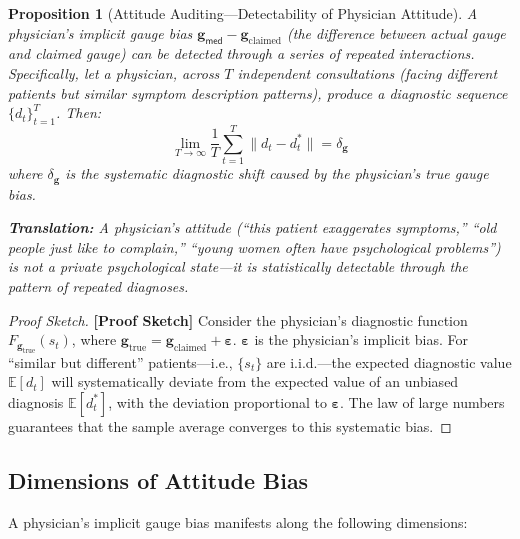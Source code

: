 \documentclass[12pt,a4paper]{article}
\newtheorem{proposition}[theorem]{Proposition}
\theoremstyle{remark}
\newcommand{\med}{\textsf{med}}
\newcommand{\rigorSketch}{\textnormal{\textbf{[Proof Sketch]}}}
\begin{document}
\begin{proposition}[Attitude Auditing---Detectability of Physician Attitude]\label{prop:attitude}
A physician's implicit gauge bias $\mathbf{g}_{\med} - \mathbf{g}_{\text{claimed}}$ (the difference between actual gauge and claimed gauge) can be detected through a series of repeated interactions. Specifically, let a physician, across $T$ independent consultations (facing different patients but similar symptom description patterns), produce a diagnostic sequence $\{d_t\}_{t=1}^{T}$. Then:
\begin{equation}
    \lim_{T \to \infty} \frac{1}{T} \sum_{t=1}^{T} \|d_t - d_t^*\| = \delta_{\mathbf{g}}
\end{equation}
where $\delta_{\mathbf{g}}$ is the systematic diagnostic shift caused by the physician's true gauge bias.

\textbf{Translation:} A physician's attitude (``this patient exaggerates symptoms,'' ``old people just like to complain,'' ``young women often have psychological problems'') is not a private psychological state---it is statistically detectable through the pattern of repeated diagnoses.
\end{proposition}

\begin{proof}[Proof Sketch]\rigorSketch
Consider the physician's diagnostic function $F_{\mathbf{g}_{\text{true}}}(s_t)$, where $\mathbf{g}_{\text{true}} = \mathbf{g}_{\text{claimed}} + \bm{\varepsilon}$. $\bm{\varepsilon}$ is the physician's implicit bias. For ``similar but different'' patients---i.e., $\{s_t\}$ are i.i.d.---the expected diagnostic value $\mathbb{E}[d_t]$ will systematically deviate from the expected value of an unbiased diagnosis $\mathbb{E}[d_t^*]$, with the deviation proportional to $\bm{\varepsilon}$. The law of large numbers guarantees that the sample average converges to this systematic bias.
\end{proof}

\subsection{Dimensions of Attitude Bias}

A physician's implicit gauge bias manifests along the following dimensions:
\end{document}

